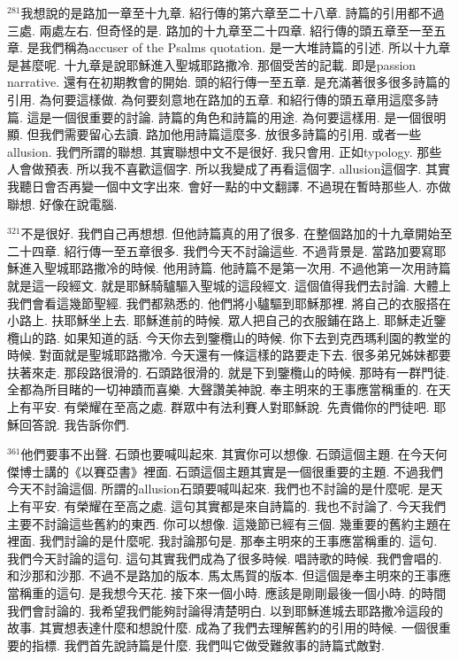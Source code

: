 \documentclass{book}
\begin{document}
$^{281}$我想說的是路加一章至十九章.
紹行傳的第六章至二十八章.
詩篇的引用都不過三處.
兩處左右.
但奇怪的是.
路加的十九章至二十四章.
紹行傳的頭五章至一至五章.
是我們稱為accuser of the Psalms quotation.
是一大堆詩篇的引述.
所以十九章是甚麼呢.
十九章是說耶穌進入聖城耶路撒冷.
那個受苦的記載.
即是passion narrative.
還有在初期教會的開始.
頭的紹行傳一至五章.
是充滿著很多很多詩篇的引用.
為何要這樣做.
為何要刻意地在路加的五章.
和紹行傳的頭五章用這麼多詩篇.
這是一個很重要的討論.
詩篇的角色和詩篇的用途.
為何要這樣用.
是一個很明顯.
但我們需要留心去讀.
路加他用詩篇這麼多.
放很多詩篇的引用.
或者一些allusion.
我們所謂的聯想.
其實聯想中文不是很好.
我只會用.
正如typology.
那些人會做預表.
所以我不喜歡這個字.
所以我變成了再看這個字.
allusion這個字.
其實我聽日會否再變一個中文字出來.
會好一點的中文翻譯.
不過現在暫時那些人.
亦做聯想.
好像在說電腦.

$^{321}$不是很好.
我們自己再想想.
但他詩篇真的用了很多.
在整個路加的十九章開始至二十四章.
紹行傳一至五章很多.
我們今天不討論這些.
不過背景是.
當路加要寫耶穌進入聖城耶路撒冷的時候.
他用詩篇.
他詩篇不是第一次用.
不過他第一次用詩篇就是這一段經文.
就是耶穌騎驢驅入聖城的這段經文.
這個值得我們去討論.
大體上我們會看這幾節聖經.
我們都熟悉的.
他們將小驢驅到耶穌那裡.
將自己的衣服搭在小路上.
扶耶穌坐上去.
耶穌進前的時候.
眾人把自己的衣服鋪在路上.
耶穌走近鑒欖山的路.
如果知道的話.
今天你去到鑒欖山的時候.
你下去到克西瑪利園的教堂的時候.
對面就是聖城耶路撒冷.
今天還有一條這樣的路要走下去.
很多弟兄姊妹都要扶著來走.
那段路很滑的.
石頭路很滑的.
就是下到鑒欖山的時候.
那時有一群門徒.
全都為所目睹的一切神蹟而喜樂.
大聲讚美神說.
奉主明來的王事應當稱重的.
在天上有平安.
有榮耀在至高之處.
群眾中有法利賽人對耶穌說.
先責備你的門徒吧.
耶穌回答說.
我告訴你們.

$^{361}$他們要事不出聲.
石頭也要喊叫起來.
其實你可以想像.
石頭這個主題.
在今天何傑博士講的《以賽亞書》裡面.
石頭這個主題其實是一個很重要的主題.
不過我們今天不討論這個.
所謂的allusion石頭要喊叫起來.
我們也不討論的是什麼呢.
是天上有平安.
有榮耀在至高之處.
這句其實都是來自詩篇的.
我也不討論了.
今天我們主要不討論這些舊約的東西.
你可以想像.
這幾節已經有三個.
幾重要的舊約主題在裡面.
我們討論的是什麼呢.
我討論那句是.
那奉主明來的王事應當稱重的.
這句.
我們今天討論的這句.
這句其實我們成為了很多時候.
唱詩歌的時候.
我們會唱的.
和沙那和沙那.
不過不是路加的版本.
馬太馬賀的版本.
但這個是奉主明來的王事應當稱重的這句.
是我想今天花.
接下來一個小時.
應該是剛剛最後一個小時.
的時間我們會討論的.
我希望我們能夠討論得清楚明白.
以到耶穌進城去耶路撒冷這段的故事.
其實想表達什麼和想說什麼.
成為了我們去理解舊約的引用的時候.
一個很重要的指標.
我們首先說詩篇是什麼.
我們叫它做受難敘事的詩篇式敵對.
\end{document}
